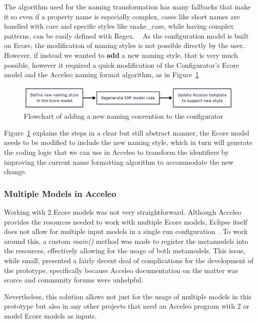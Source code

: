 The algorithm used for the naming transformation has many fallbacks that make it so even if a property name is especially complex, cases like short names are handled with care and specific styles like snake\_case, while having complex patterns, can be easily defined with Regex. 
~\cite{eclipse_emf}
As the configuration model is built on Ecore, the modification of naming styles is not possible directly by the user. However, if instead we wanted to \textbf{add} a new naming style, that is very much possible, however it required a quick modification of the Configurator's Ecore model and the Acceleo naming format algorithm, as in Figure~\ref{fig:prototype_new_naming}

\begin{figure}[htbp]
	\centering
	\includegraphics[height=0.10\textwidth]{newNamingConvention.png}
	\caption{Flowchart of adding a new naming convention to the configurator}
	\label{fig:prototype_new_naming}
\end{figure}

Figure~\ref{fig:prototype_new_naming} explains the steps in a clear but still abstract manner, the Ecore model needs to be modified to include the new naming style, which in turn will generate the coding logic that we can use in Acceleo to transform the \glspl{identifier} by improving the current name formatting algorithm to accommodate the new change.

\subsubsection{Multiple Models in Acceleo}

Working with 2 Ecore models was not very straightforward. Although Acceleo provides the resources needed to work with multiple Ecore models, Eclipse itself does not allow for multiple input models in a single run configuration~\cite{acceleo_multi_model_problem}. To work around this, a custom \textit{main()} method was made to register the metamodels into the resources, effectively allowing for the usage of both metamodels. This issue, while small, presented a fairly decent deal of complications for the development of the prototype, specifically because Acceleo documentation on the matter was scarce and community forums were unhelpful.

Nevertheless, this solution allows not just for the usage of multiple models in this prototype but also in any other projects that need an Acceleo program with 2 or model Ecore models as inputs.


